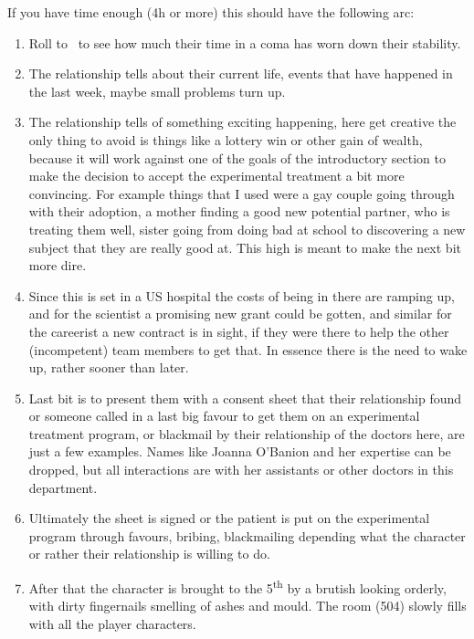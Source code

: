 \documentclass[bg-full]{resources/stylesheets/kult}
\begin{document}
If you have time enough (4h or more) this should have the following arc:
\begin{enumerate}
  \item Roll to~ to see how much their time in a coma has worn down their stability.

  \item The relationship tells about their current life, events that have happened in the last week, maybe small problems turn up.

  \item The relationship tells of something exciting happening, here get creative the only thing to avoid is things like a
        lottery win or other gain of wealth, because it will work against one of the goals of the introductory section to make the
        decision to accept the experimental treatment a bit more convincing.  For example things that I used were a gay couple going
        through with their adoption, a mother finding a good new potential partner, who is treating them well, sister going from doing
        bad at school to discovering a new subject that they are really good at.  This high is meant to make the next bit more dire.

  \item Since this is set in a US hospital the costs of being in there are ramping up, and for the scientist a promising new
        grant could be gotten, and similar for the careerist a new contract is in sight, if they were there to help the other
        (incompetent) team members to get that.  In essence there is the need to wake up, rather sooner than later.

  \item Last bit is to present them with a consent sheet that their relationship found or someone called in a last big favour
        to get them on an experimental treatment program, or blackmail by their relationship of the doctors here, are just a few
        examples.  Names like Joanna O'Banion and her expertise can be dropped, but all interactions are
        with her assistants or other doctors in this department.

  \item Ultimately the sheet is signed or the patient is put on the experimental program through favours, bribing, blackmailing
        depending what the character or rather their relationship is willing to do.

  \item After that the character is brought to the 5\textsuperscript{th} by a brutish looking orderly, with dirty fingernails
        smelling of ashes and mould.  The room (504) slowly fills with all the player characters.
\end{enumerate}
\end{document}
